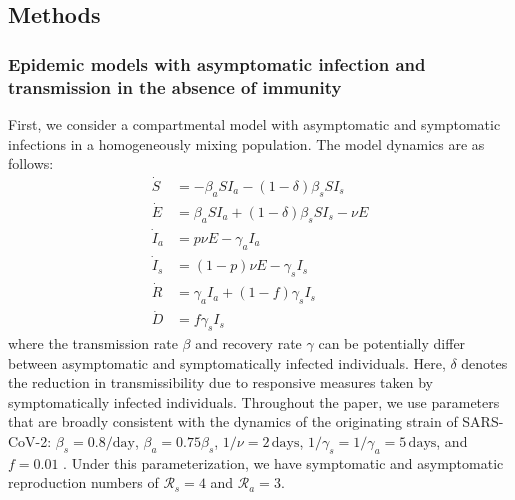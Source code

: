 \documentclass[12pt]{article}
\newcommand{\RR}{\ensuremath{{\mathcal R}}\xspace}
\begin{document}
\subsection*{Methods}

\subsubsection*{Epidemic models with asymptomatic infection and transmission in the absence of immunity}

First, we consider a compartmental model with asymptomatic and symptomatic infections in a homogeneously mixing population.
The model dynamics are as follows:
\begin{align}
\dot{S} &= -\beta_a S I_a -(1-\delta) \beta_s S I_s \\
\dot{E} &= \beta_a S I_a + (1-\delta) \beta_s S I_s - \nu E\\
\dot{I}_a &= p \nu E - \gamma_a I_a\\
\dot{I}_s &= (1-p) \nu E -\gamma_s I_s\\
\dot{R} &= \gamma_a I_a + (1-f) \gamma_s I_s \\
\dot{D} &= f \gamma_s I_s
\end{align}
where the transmission rate $\beta$ and recovery rate $\gamma$ can be potentially differ between asymptomatic and symptomatically infected individuals.  
Here, $\delta$ denotes the reduction in transmissibility due to responsive measures taken by symptomatically infected individuals.
Throughout the paper, we use parameters that are broadly consistent with the dynamics of the originating strain of SARS-CoV-2: $\beta_s = 0.8/\mathrm{day}$, $\beta_a = 0.75 \beta_s$, $1/\nu=2\,\mathrm{days}$, $1/\gamma_s=1/\gamma_a=5\,\mathrm{days}$, and $f=0.01$ \citep{park2020reconciling}.
Under this parameterization, we have symptomatic and asymptomatic reproduction numbers of $\RR_s = 4$ and $\RR_a = 3$.
\end{document}
